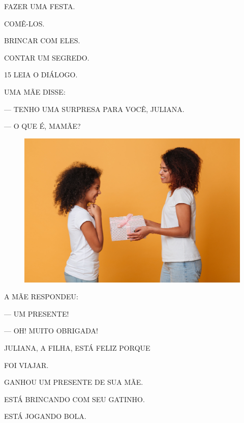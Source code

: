 \begin{escolha}[itemsep=-5pt]
\item FAZER UMA FESTA.

\item COMÊ-LOS.

\item BRINCAR COM ELES.

\item CONTAR UM SEGREDO.
\end{escolha}

\pagebreak

\num{15} LEIA O DIÁLOGO. %



\begin{myquote}
UMA MÃE DISSE:

--- TENHO UMA SURPRESA PARA VOCÊ, JULIANA.

--- O QUE É, MAMÃE?
\end{myquote}

\begin{figure}[H]
\centering
\includegraphics[width=.8\textwidth]{media/image259.png}
\end{figure}

\begin{myquote}
A MÃE RESPONDEU:

--- UM PRESENTE!

--- OH! MUITO OBRIGADA!
\end{myquote}

JULIANA, A FILHA, ESTÁ FELIZ PORQUE

\begin{escolha}
\item FOI VIAJAR.

\item GANHOU UM PRESENTE DE SUA MÃE.

\item ESTÁ BRINCANDO COM SEU GATINHO.

\item ESTÁ JOGANDO BOLA.
\end{escolha}


